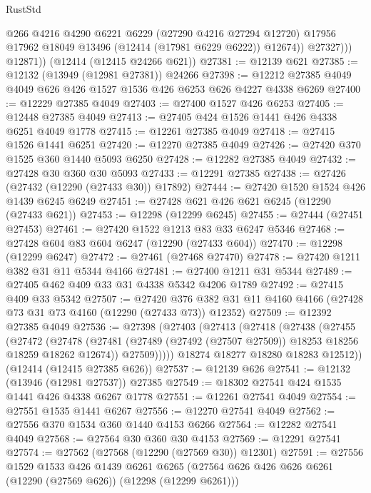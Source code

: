 \begin{lexlean}{RustStd}
\begin{coremodule}
{\begin{coremodule}
{{{{{{{{{{{{{{{{{{{{{{{{{{{{{{{{{{{{{{{{{{{{{{{{{{                  @266
                  @4216
                  @4290
                  @6221
                  @6229
                  (@27290 @4216 @27294 @12720)
                  @17956
                  @17962
                  @18049
                  @13496
                  (@12414 (@17981 @6229 @6222))
                  @12674))
              @27327)))
        @12871))
    (@12414 (@12415 @24266 @621))
@27381 := @12139 @621
@27385 := @12132 (@13949 (@12981 @27381)) @24266
@27398 := @12212 @27385 @4049 @4049 @626 @426 @1527 @1536 @426 @6253 @626 @4227 @4338 @6269
@27400 := @12229 @27385 @4049
@27403 := @27400 @1527 @426 @6253
@27405 := @12448 @27385 @4049
@27413 := @27405 @424 @1526 @1441 @426 @4338 @6251 @4049 @1778
@27415 := @12261 @27385 @4049
@27418 := @27415 @1526 @1441 @6251
@27420 := @12270 @27385 @4049
@27426 := @27420 @370 @1525 @360 @1440 @5093 @6250
@27428 := @12282 @27385 @4049
@27432 := @27428 @30 @360 @30 @5093
@27433 := @12291 @27385
@27438 := @27426 (@27432 (@12290 (@27433 @30)) @17892)
@27444 := @27420 @1520 @1524 @426 @1439 @6245 @6249
@27451 := @27428 @621 @426 @621 @6245 (@12290 (@27433 @621))
@27453 := @12298 (@12299 @6245)
@27455 := @27444 (@27451 @27453)
@27461 := @27420 @1522 @1213 @83 @33 @6247 @5346
@27468 := @27428 @604 @83 @604 @6247 (@12290 (@27433 @604))
@27470 := @12298 (@12299 @6247)
@27472 := @27461 (@27468 @27470)
@27478 := @27420 @1211 @382 @31 @11 @5344 @4166
@27481 := @27400 @1211 @31 @5344
@27489 := @27405 @462 @409 @33 @31 @4338 @5342 @4206 @1789
@27492 := @27415 @409 @33 @5342
@27507 := @27420
    @376
    @382
    @31
    @11
    @4160
    @4166
    (@27428 @73 @31 @73 @4160 (@12290 (@27433 @73)) @12352)
@27509 := @12392 @27385 @4049
@27536 := @27398
    (@27403
      (@27413
        (@27418
          (@27438
            (@27455
              (@27472
                (@27478
                  (@27481 (@27489 (@27492 (@27507 @27509)) @18253 @18256 @18259 @18262 @12674))
                  @27509)))))
        @18274
        @18277
        @18280
        @18283
        @12512))
    (@12414 (@12415 @27385 @626))
@27537 := @12139 @626
@27541 := @12132 (@13946 (@12981 @27537)) @27385
@27549 := @18302 @27541 @424 @1535 @1441 @426 @4338 @6267 @1778
@27551 := @12261 @27541 @4049
@27554 := @27551 @1535 @1441 @6267
@27556 := @12270 @27541 @4049
@27562 := @27556 @370 @1534 @360 @1440 @4153 @6266
@27564 := @12282 @27541 @4049
@27568 := @27564 @30 @360 @30 @4153
@27569 := @12291 @27541
@27574 := @27562 (@27568 (@12290 (@27569 @30)) @12301)
@27591 := @27556
    @1529
    @1533
    @426
    @1439
    @6261
    @6265
    (@27564 @626 @426 @626 @6261 (@12290 (@27569 @626)) (@12298 (@12299 @6261)))
}}}}}}}}}}}}}}}}}}}}}}}}}}}}}}}}}}}}}}}}}}}}}}}}}}
\end{coremodule}}
\end{coremodule}
\end{lexlean}
